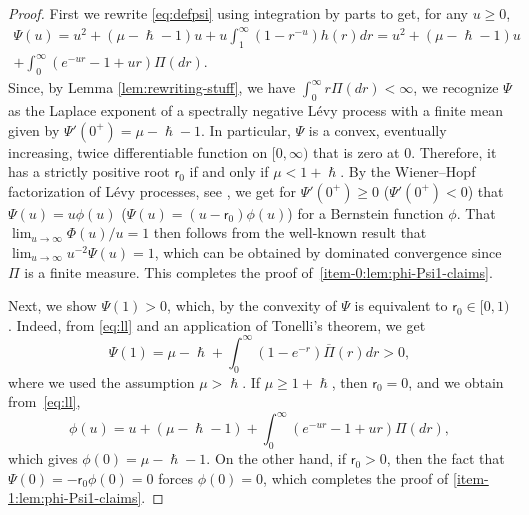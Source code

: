 \documentclass[10pt]{amsart}
\theoremstyle{plain}
\theoremstyle{definition}
\newcommand{\tet}{{\mathsf{r}_0}}
\let\h\hslash
\let\mo\mu
\begin{document}
\begin{proof}
First we rewrite \eqref{eq:defpsi} using integration by parts to get, for any $u\geq0$,
\begin{multline}
\label{eq:ll}
\Psi(u) = u^2+(\mo-\h-1)u+u\int_1^\infty (1-r^{-u})h(r)dr = u^2+(\mo-\h-1)u\\[-5pt]
+ \int_0^\infty (e^{-ur}-1+ur)\Pi(dr).
\end{multline}
Since, by Lemma \ref{lem:rewriting-stuff}, we have $\int_0^\infty r\Pi(dr) < \infty$, we recognize $\Psi$ as the Laplace exponent of a spectrally negative Lévy process with a finite mean given by $\Psi'(0^+)=\mu-\h-1$. In particular, $\Psi$ is a convex, eventually increasing, twice differentiable function on $[0,\infty)$ that is zero at $0$. Therefore, it has a strictly positive root $\tet$ if and only if $\mo < 1+\h$. By the Wiener--Hopf factorization of Lévy processes, see \eg \cite[Chap.\,6.4]{Kyprianou2014}, we get for $\Psi'(0^+) \geq 0$ (\resp $\Psi'(0^+) < 0$) that $\Psi(u) = u\phi(u)$ (\resp $\Psi(u) = (u-\tet)\phi(u)$) for a Bernstein function $\phi$. That $\lim_{u \to \infty} \Phi(u)/u = 1$ then follows from the well-known result that $\lim_{u \to \infty} u^{-2}\Psi(u) = 1$, which can be obtained by dominated convergence since $\Pi$ is a finite measure. This completes the proof of~\eqref{item-0:lem:phi-Psi1-claims}.

Next, we show $\Psi(1) > 0$, which, by the convexity of $\Psi$ is equivalent to $\tet \in [0,1)$. Indeed, from \eqref{eq:ll} and an application of Tonelli's theorem, we get
\begin{equation*}
\Psi(1) = \mo-\h + \int_0^\infty (1-e^{-r})\overline{\Pi}(r)dr > 0,
\end{equation*}
where we used the assumption $\mo > \h$. If $\mo \geq 1 + \h$, then $\tet = 0$, and we obtain from~\eqref{eq:ll},
\begin{equation*}
\phi(u) = u+(\mo-\h-1)+ \int_0^\infty (e^{-ur}-1+ur)\Pi(dr),
\end{equation*}
which gives $\phi(0) = \mo - \h - 1$. On the other hand, if $\tet > 0$, then the fact that $\Psi(0)=-\tet\phi(0) = 0$ forces $\phi(0)=0$, which completes the proof of \eqref{item-1:lem:phi-Psi1-claims}.


\end{proof}
\end{document}

